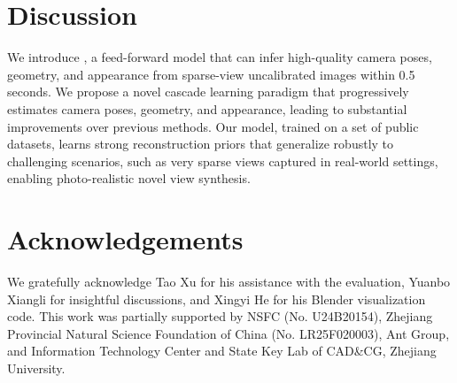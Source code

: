 \section{Discussion}\label{sec::conclusion}

We introduce \method, a feed-forward model that can infer high-quality camera poses, geometry, and appearance from sparse-view uncalibrated images within 0.5 seconds.
%
We propose a novel cascade learning paradigm that progressively estimates camera poses, geometry, and appearance, leading to substantial improvements over previous methods.
%
Our model, trained on a set of public datasets, learns strong reconstruction priors that generalize robustly to challenging scenarios, such as very sparse views captured in real-world settings, enabling photo-realistic novel view synthesis.



\section*{Acknowledgements}
We gratefully acknowledge Tao Xu for his assistance with the evaluation, Yuanbo Xiangli for insightful discussions, and Xingyi He for his Blender visualization code.
This work was partially supported by NSFC (No. U24B20154), Zhejiang Provincial Natural Science Foundation of China (No. LR25F020003), Ant Group, and Information Technology Center and State Key Lab of CAD\&CG, Zhejiang University.